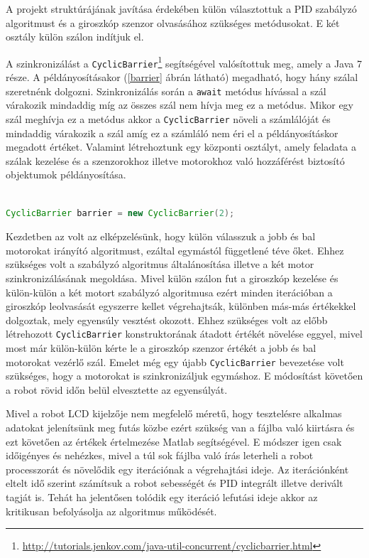 A projekt struktúrájának javítása érdekében külön választottuk a PID szabályzó algoritmust és a giroszkóp szenzor olvasásához szükséges metódusokat. E két osztály külön szálon indítjuk el. 

A szinkronizálást a \texttt{CyclicBarrier}\footnote{\href{http://tutorials.jenkov.com/java-util-concurrent/cyclicbarrier.html}{http://tutorials.jenkov.com/java-util-concurrent/cyclicbarrier.html}} segítségével valósítottuk meg, amely a Java 7 része. A példányosításakor (\ref{barrier} ábrán látható) megadható, hogy hány szálal szeretnénk dolgozni. Szinkronizálás során a \texttt{await} metódus hívással a szál várakozik mindaddig míg az összes szál nem hívja meg ez a metódus. Mikor egy szál meghívja ez a metódus akkor a \texttt{CyclicBarrier} növeli a számlálóját és mindaddig várakozik a szál amíg ez a számláló nem éri el a példányosításkor megadott értéket. Valamint létrehoztunk egy központi osztályt, amely feladata a szálak kezelése és a szenzorokhoz illetve motorokhoz való hozzáférést biztosító objektumok példányosítása.

\begin{lstlisting}[label=barrier, caption= CyclicBarrier példányosítása , language=Java]

CyclicBarrier barrier = new CyclicBarrier(2);

\end{lstlisting}

Kezdetben az volt az elképzelésünk, hogy külön válasszuk a jobb és bal motorokat irányító algoritmust, ezáltal egymástól függetlené téve őket. Ehhez szükséges volt a szabályzó algoritmus általánosítása illetve a két motor szinkronizálásának megoldása. Mivel külön szálon fut a giroszkóp kezelése és külön-külön a két motort szabályzó algoritmusa ezért minden iterációban a giroszkóp leolvasását egyszerre kellet végrehajtsák, különben más-más értékekkel dolgoztak, mely egyensúly vesztést okozott. Ehhez szükséges volt az előbb létrehozott \texttt{CyclicBarrier} konstruktorának átadott értékét növelése eggyel, mivel most már külön-külön kérte le a giroszkóp szenzor értékét a jobb és bal motorokat vezérlő szál. Emelet még egy újabb \texttt{CyclicBarrier} bevezetése volt szükséges, hogy a motorokat is szinkronizáljuk egymáshoz. E módosítást követően a robot rövid időn belül elvesztette az egyensúlyát.

Mivel a robot LCD kijelzője nem megfelelő méretű, hogy tesztelésre alkalmas adatokat jelenítsünk meg futás közbe ezért szükség van a fájlba való kiirtásra és ezt követően az értékek értelmezése Matlab segítségével. E módszer igen csak időigényes és nehézkes, mivel a túl sok fájlba való írás leterheli a robot processzorát és növelődik egy iterációnak a végrehajtási ideje. Az iterációnként eltelt idő szerint számítsuk a robot sebességét és PID integrált illetve derivált tagját is. Tehát ha jelentősen tolódik egy iteráció lefutási ideje akkor az kritikusan befolyásolja az algoritmus működését.

